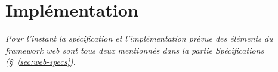 \section{Implémentation}

\textit{Pour l'instant la spécification et l'implémentation prévue des éléments du framework web sont tous deux mentionnés dans la partie Spécifications (§~\ref{sec:web-specs}).}